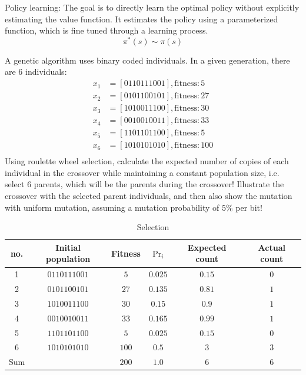\documentclass[a4paper,12pt,answers]{exam}
\begin{document}
\begin{questions}
\begin{solution}
		Policy learning: The goal is to directly learn the optimal policy without explicitly estimating the value function. It estimates the policy using a parameterized function, which is fine tuned through a learning process.
		\[
		\pi^*(s) \sim \pi(s)
		\]
	\end{solution}
	
	\newpage
	\question[30]
	A genetic algorithm uses binary coded individuals. In a given generation, there are 6 individuals:
	\begin{align*}
		x_1 &=  \left[ 0110111001 \right], \text{fitness}: 5 \\
		x_2 &=  \left[ 0101100101 \right], \text{fitness}: 27 \\
		x_3 &=  \left[ 1010011100 \right], \text{fitness}: 30 \\
		x_4 &=  \left[ 0010010011 \right], \text{fitness}: 33 \\
		x_5 &=  \left[ 1101101100 \right], \text{fitness}: 5 \\
		x_6 &=  \left[ 1010101010 \right], \text{fitness}: 100 \\
	\end{align*}
	Using roulette wheel selection, calculate the expected number of copies of each individual in the crossover while maintaining a constant population size, i.e. select 6 parents, which will be the parents during the crossover! Illustrate the crossover with the selected parent individuals, and then also show the mutation with uniform mutation, assuming a mutation probability of $5\%$ per bit!
	\begin{solution}
		\begin{table}[H]
			\centering
			\begin{tabular}{|c|c|c||c|c|c|}
				\hline
				no. & Initial population & Fitness & $\Pr_i$ & Expected count & Actual count \\
				\hline
				1 & $0110111001$ & $5$ & $0.025$ & $0.15$ & $0$ \\
				2 & $0101100101$ & $27$ & $0.135$ & $0.81$ & $1$ \\
				3 & $1010011100$ & $30$ & $0.15$ & $0.9$ & $1$  \\
				4 & $0010010011$ & $33$ & $0.165$ & $0.99$ & $1$ \\
				5 & $1101101100$ & $5$ & $0.025$ & $0.15$  & $0$ \\
				6 & $1010101010$ & $100$ & $0.5$ & $3$ & $3$ \\
				\hline
				Sum & & $200$ & $1.0$ & $6$ & $6$ \\
				\hline
			\end{tabular}
			\caption{Selection}
		\end{table}
		

\end{solution}
\end{questions}
\end{document}
